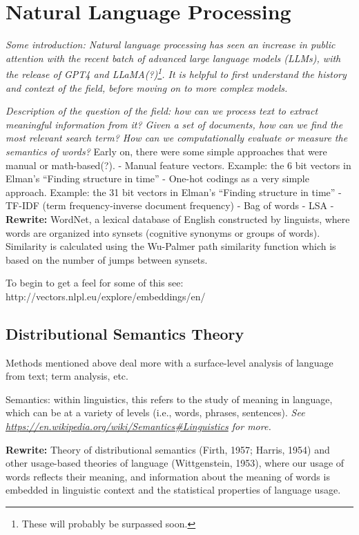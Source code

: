 \chapter{Natural Language Processing}\label{ch_nlp}

\textit{Some introduction: Natural language processing has seen an increase in public attention with the recent batch of advanced large language models (LLMs), with the release of GPT4 and LLaMA(?)\footnote{These will probably be surpassed soon.}. It is helpful to first understand the history and context of the field, before moving on to more complex models.}

\textit{Description of the question of the field: how can we process text to extract meaningful information from it? Given a set of documents, how can we find the most relevant search term? How can we computationally evaluate or measure the semantics of words?}
Early on, there were some simple approaches that were manual or math-based(?).
- Manual feature vectors.  Example: the 6 bit vectors in Elman's ``Finding structure in time''
- One-hot codings as a very simple approach. Example: the 31 bit vectors  in Elman's ``Finding structure in time''
- TF-IDF (term frequency-inverse document frequency)
- Bag of words
- LSA
- \textbf{Rewrite:} WordNet, a lexical database of English constructed by linguists, where words are organized into synsets (cognitive synonyms or groups of words). Similarity is calculated using the Wu-Palmer path similarity function which is based on the number of jumps between synsets.

To begin to get a feel for some of this see: http://vectors.nlpl.eu/explore/embeddings/en/

\section{Distributional Semantics Theory}

Methods mentioned above deal more with a surface-level analysis of language from text; term analysis, etc.

Semantics: within linguistics, this refers to the study of meaning in language, which can be at a variety of levels (i.e., words, phrases, sentences). \textit{See \url{https://en.wikipedia.org/wiki/Semantics#Linguistics} for more.}

\textbf{Rewrite:} Theory of distributional semantics (Firth, 1957; Harris, 1954) and other usage-based theories of language (Wittgenstein, 1953), where our usage of words reflects their meaning, and information about the meaning of words is embedded in linguistic context and the statistical properties of language usage. 

